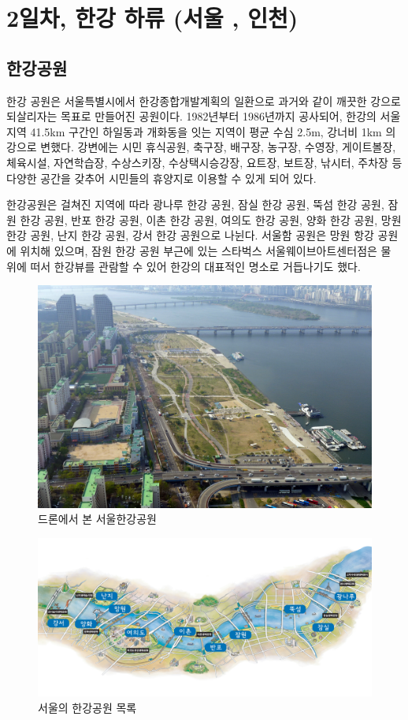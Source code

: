 \chapter{2일차, 한강 하류 (서울 , 인천)}
\section{한강공원}

한강 공원은 서울특별시에서 한강종합개발계획의 일환으로 과거와 같이 깨끗한 강으로
되살리자는 목표로 만들어진 공원이다. 1982년부터 1986년까지 공사되어, 한강의 서울
지역 41.5km 구간인 하일동과 개화동을 잇는 지역이 평균 수심 2.5m, 강너비 1km 의
강으로 변했다. 강변에는 시민 휴식공원, 축구장, 배구장, 농구장, 수영장, 게이트볼장, 
체육시설, 자연학습장, 수상스키장, 수상택시승강장, 요트장, 보트장, 낚시터, 주차장 등 다양한
공간을 갖추어 시민들의 휴양지로 이용할 수 있게 되어 있다.


한강공원은 걸쳐진 지역에 따라 광나루 한강 공원, 잠실 한강 공원, 뚝섬 한강 공원,
잠원 한강 공원, 반포 한강 공원, 이촌 한강 공원, 여의도 한강 공원, 양화 한강 공원, 
망원한강 공원, 난지 한강 공원, 강서 한강 공원으로 나뉜다. 서울함 공원은 망원 항강 공원에
위치해 있으며, 잠원 한강 공원 부근에 있는 스타벅스 서울웨이브아트센터점은 물 위에 
떠서 한강뷰를 관람할 수 있어 한강의 대표적인 명소로 거듭나기도 했다.


\begin{figure}
    \centering
    \includegraphics[width=.6\textwidth]{e_img/ww_-000.jpg}
    \caption{드론에서 본 서울한강공원}
    \label{fig:haryu1}
\end{figure}


\begin{figure}
    \centering
    \includegraphics[width=.6\textwidth]{e_img/hanriver.jpg}
    \caption{서울의 한강공원 목록\protect\footnotemark}
    \label{fig:haryu2}
\end{figure}

